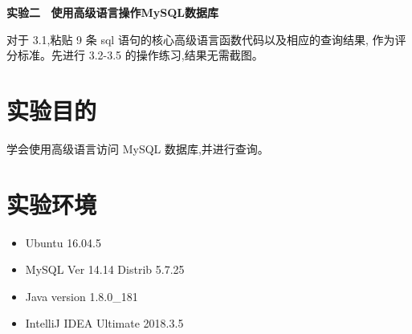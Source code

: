 \documentclass{ML}
\begin{document}
\maketitle

\newpage

\begin{center}
    \textbf{ 实验二 \ 使用高级语言操作MySQL数据库}
\end{center}

对于 3.1,粘贴 9 条 sql 语句的核心高级语言函数代码以及相应的查询结果,
作为评分标准。先进行 3.2-3.5 的操作练习,结果无需截图。

\section{实验目的}
学会使用高级语言访问 MySQL 数据库,并进行查询。
\section{实验环境}
\begin{itemize}
    \item Ubuntu 16.04.5
    \item MySQL Ver 14.14 Distrib 5.7.25
    \item Java version 1.8.0\_181
    \item IntelliJ IDEA Ultimate 2018.3.5
\end{itemize}
\end{document}
